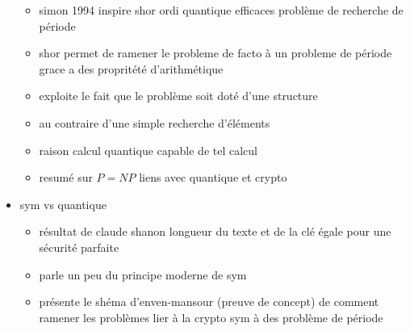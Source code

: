 \begin{itemize}
\begin{itemize}
            \item simon 1994 inspire shor ordi quantique efficaces problème de recherche
                de période
            \item shor permet de ramener le probleme de facto à un probleme de période grace a
                des propritété d'arithmétique
            \item exploite le fait que le problème soit doté d'une structure
            \item au contraire d'une simple recherche d'éléments
            \item raison calcul quantique capable de tel calcul
            \item resumé sur $P=NP$ liens avec quantique et crypto
        \end{itemize}
    \item sym vs quantique
        \begin{itemize}
            \item résultat de claude shanon longueur du texte et de la clé égale pour une
                sécurité parfaite
            \item parle un peu du principe moderne de sym
            \item présente le shéma d'enven-mansour (preuve de concept) de comment ramener
                les problèmes lier à la crypto sym à des problème de période
        \end{itemize}
\end{itemize}

